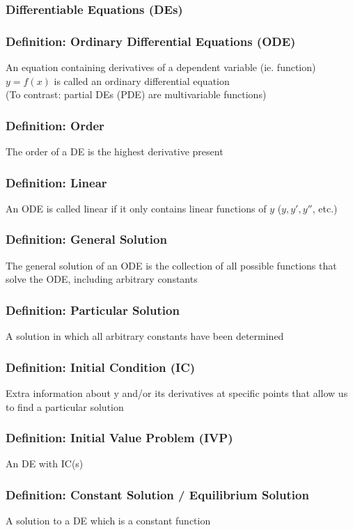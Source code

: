 \documentclass[12pt, letterpaper]{article}
\begin{document}
\subsubsection{Differentiable Equations (DEs)}
\subsubsection*{Definition: Ordinary Differential Equations (ODE)}
An equation containing derivatives of a dependent variable (ie. function) $y=f(x)$ is called an ordinary differential equation \\
(To contrast: partial DEs (PDE) are multivariable functions)
\subsubsection*{Definition: Order}
The order of a DE is the highest derivative present 
\subsubsection*{Definition: Linear}
An ODE is called linear if it only contains linear functions of $y$ ($y, y', y''$, etc.)
\subsubsection*{Definition: General Solution}
The general solution of an ODE is the collection of all possible functions that solve the ODE, including arbitrary constants
\subsubsection*{Definition: Particular Solution}
A solution in which all arbitrary constants have been determined
\subsubsection*{Definition: Initial Condition (IC)}
Extra information about y and/or its derivatives at specific points that allow us to find a particular solution 
\subsubsection*{Definition: Initial Value Problem (IVP)}
An DE with IC(s)
\subsubsection*{Definition: Constant Solution / Equilibrium Solution}
A solution to a DE which is a constant function
\end{document}
